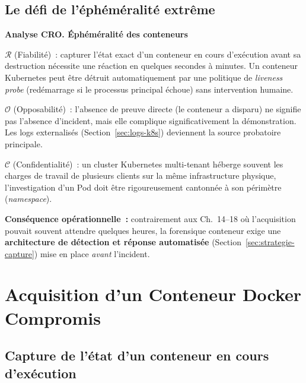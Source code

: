 \subsection{Le défi de l'éphéméralité extrême}

\begin{boxCRO}
\textbf{Analyse CRO. Éphéméralité des conteneurs}

$\mathcal{R}$ (Fiabilité)~: capturer l'état exact d'un conteneur
en cours d'exécution avant sa destruction nécessite une réaction
en quelques secondes à minutes. Un conteneur Kubernetes peut être
détruit automatiquement par une politique de \textit{liveness probe}
(redémarrage si le processus principal échoue) sans intervention
humaine.

$\mathcal{O}$ (Opposabilité)~: l'absence de preuve directe (le
conteneur a disparu) ne signifie pas l'absence d'incident, mais
elle complique significativement la démonstration. Les logs
externalisés (Section~\ref{sec:logs-k8s}) deviennent la source
probatoire principale.

$\mathcal{C}$ (Confidentialité)~: un cluster Kubernetes multi-tenant
héberge souvent les charges de travail de plusieurs clients sur
la même infrastructure physique, l'investigation d'un Pod doit
être rigoureusement cantonnée à son périmètre (\textit{namespace}).


\textbf{Conséquence opérationnelle~:} contrairement aux Ch.~14--18
où l'acquisition pouvait souvent attendre quelques heures, la
forensique conteneur exige une \textbf{architecture de détection
et réponse automatisée} (Section~\ref{sec:strategie-capture})
mise en place \emph{avant} l'incident.
\end{boxCRO}

\section{Acquisition d'un Conteneur Docker Compromis}
\label{sec:acquisition-docker}

\subsection{Capture de l'état d'un conteneur en cours d'exécution}

